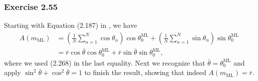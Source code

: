 \documentclass[12pt, a4paper]{article}
\begin{document}
\subsubsection*{Exercise 2.55}
Starting with Equation (2.187) in \cite{bishop_pattern_2011}, we have
\begin{align*}
	A(m_{\text{ML}})
	&=
	\left( \frac{1}{N} \sum_{n=1}^N \cos \theta_n \right) \cos \theta_0^{\text{ML}}
	+
	\left( \frac{1}{N} \sum_{n=1}^N \sin \theta_n \right) \sin \theta_0^{\text{ML}}\\
	&= 
	\bar{r} \cos \bar{\theta} \cos \theta_0^{\text{ML}}
	+
	\bar{r} \sin \bar{\theta} \sin \theta_0^{\text{ML}},
\end{align*}
where we used (2.268) in the last equality.
Next we recognize that $\bar{\theta} = \theta_0^{\text{ML}}$ and apply $\sin^2 \bar{\theta} + \cos^2 \bar{\theta} = 1$ to finish the result, showing that indeed $A(m_{\text{ML}}) = \bar{r}$.
\end{document}
